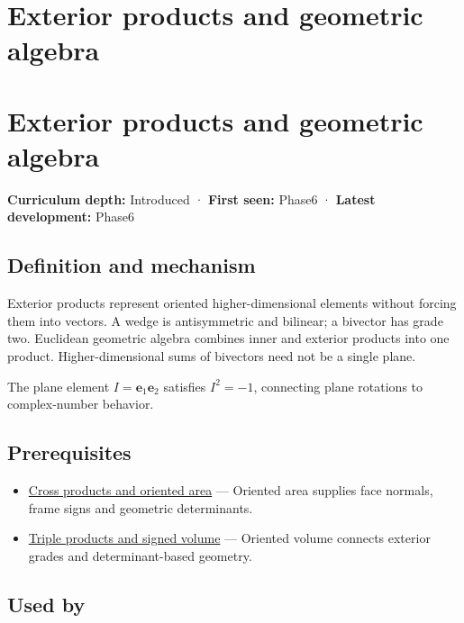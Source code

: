 \hypertarget{appendix-e1960925d1b8}{}
\section*{Exterior products and geometric algebra}
\section{Exterior products and geometric algebra}\label{appendix-e1960925d1b8-exterior-products-and-geometric-algebra}

\textbf{Curriculum depth:} Introduced · \textbf{First seen:} Phase6 · \textbf{Latest development:} Phase6

\subsection{Definition and mechanism}\label{appendix-e1960925d1b8-definition-and-mechanism}

Exterior products represent oriented higher-dimensional elements without forcing them into vectors. A wedge is antisymmetric and bilinear; a bivector has grade two. Euclidean geometric algebra combines inner and exterior products into one product. Higher-dimensional sums of bivectors need not be a single plane.

The plane element \(I=\mathbf e_1\mathbf e_2\) satisfies \(I^2=-1\), connecting plane rotations to complex-number behavior.

\subsection{Prerequisites}\label{appendix-e1960925d1b8-prerequisites}

\begin{itemize}
\tightlist
\item
  \hyperref[appendix-2391db8052b1]{Cross products and oriented area} --- Oriented area supplies face normals, frame signs and geometric determinants.
\item
  \hyperref[appendix-5caa058bd9c7]{Triple products and signed volume} --- Oriented volume connects exterior grades and determinant-based geometry.
\end{itemize}

\subsection{Used by}\label{appendix-e1960925d1b8-used-by}

